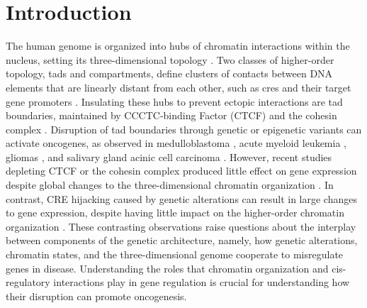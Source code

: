 \section{Introduction}

The human genome is organized into hubs of chromatin interactions within the nucleus, setting its three-dimensional topology \cite{finnMolecularBasisBiological2019}.
Two classes of higher-order topology, \glspl{tad} and compartments, define clusters of contacts between DNA elements that are linearly distant from each other, such as \glspl{cre} and their target gene promoters \cite{dixonTopologicalDomainsMammalian2012,noraSpatialPartitioningRegulatory2012}.
Insulating these hubs to prevent ectopic interactions are \gls{tad} boundaries, maintained by CCCTC-binding Factor (CTCF) and the cohesin complex \cite{pomboThreedimensionalGenomeArchitecture2015}.
Disruption of \gls{tad} boundaries through genetic or epigenetic variants can activate oncogenes, as observed in medulloblastoma \cite{northcottEnhancerHijackingActivates2014}, acute myeloid leukemia \cite{groschelSingleOncogenicEnhancer2014}, gliomas \cite{flavahanInsulatorDysfunctionOncogene2016}, and salivary gland acinic cell carcinoma \cite{hallerEnhancerHijackingActivates2019}.
However, recent studies depleting CTCF or the cohesin complex produced little effect on gene expression despite global changes to the three-dimensional chromatin organization \cite{oudelaarRelationshipGenomeStructure2020,despangFunctionalDissectionSox92019,williamsonDevelopmentallyRegulatedShh2019}.
In contrast, CRE hijacking caused by genetic alterations can result in large changes to gene expression, despite having little impact on the higher-order chromatin organization \cite{northcottEnhancerHijackingActivates2014,zhouEmergenceNoncodingCancer2016}.
These contrasting observations raise questions about the interplay between components of the genetic architecture, namely, how genetic alterations, chromatin states, and the three-dimensional genome cooperate to misregulate genes in disease.
Understanding the roles that chromatin organization and cis-regulatory interactions play in gene regulation is crucial for understanding how their disruption can promote oncogenesis.

